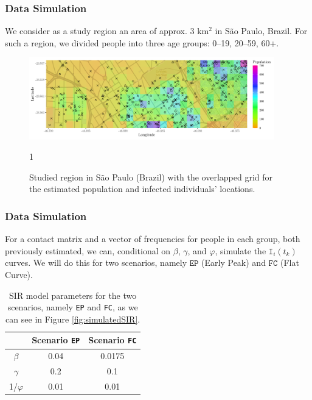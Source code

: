 \documentclass[12pt, aspectratio = 169]{beamer} %
\begin{document}
		\begin{frame}[t]
		\frametitle{Data Simulation}
		\justifying
		
		We consider as a study region an area of approx. 3 km${}^{2}$ in São Paulo, Brazil. For such a region, we divided people into three age groups: 0--19, 20--59, 60+.
		
		\begin{figure}[!ht]
			\centering\vspace{-3pt}
			\includegraphics[width = 0.95\textwidth]{Images/map.png}\vspace{-12pt}
			\caption{\justifying Studied region in  São Paulo (Brazil) with the overlapped grid for the estimated population and infected individuals' locations.}1
			\label{fig:map}
		\end{figure}
		
	\end{frame}
	
	\begin{frame}[t]
		\frametitle{Data Simulation}
		\justifying
		
		For a contact matrix and a vector of frequencies for people in each group, both previously estimated, we can, conditional on $\beta$, $\gamma$, and $\varphi$, simulate the $\texttt{I}_i(t_k)$ curves. We will do this for two scenarios, namely $\texttt{EP}$ (Early Peak) and $\texttt{FC}$ (Flat Curve).
		
		\begin{table}[!ht]
			\caption{\justifying SIR model parameters for the two scenarios, namely \texttt{EP} and \texttt{FC}, as we can see in Figure \ref{fig:simulatedSIR}.}
			\centering
				\begin{tabular}{c|c|c}
					& Scenario \texttt{EP} & Scenario \texttt{FC} \\ \hline
					$\beta$     & 0.04   &  0.0175 \\
					$\gamma$    & 0.2\phantom{0} &  0.1\phantom{000} \\
					1/$\varphi$  & 0.01   &  0.01\phantom{00}
				\end{tabular}%
			\label{tab:parametersSIR}
		\end{table}
		
	\end{frame}
	
\end{document}
